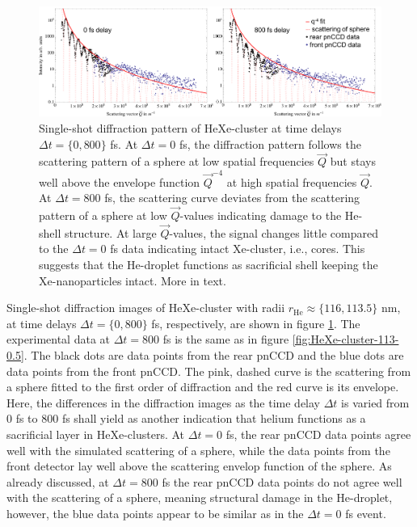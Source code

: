 \begin{figure}
	\centering
		\includegraphics[width=1.00\textwidth]{images/results/HeXe-comparison-0-800-fs.png}
	\caption[Single-shot diffraction patterns of HeXe-cluster at different time delays]{Single-shot diffraction pattern of HeXe-cluster at time delays $\Delta t =\{0,800\}$ fs. At $\Delta t=0$ fs, the diffraction pattern follows the scattering pattern of a sphere at low spatial frequencies $\vec{Q}$ but stays well above the envelope function $\vec{Q}^{-4}$ at high spatial frequencies $\vec{Q}$. At $\Delta t=800$ fs, the scattering curve deviates from the scattering pattern of a sphere at low $\vec{Q}$-values indicating damage to the He-shell structure. At large $\vec{Q}$-values, the signal changes little compared to the $\Delta t=0$ fs data indicating intact Xe-cluster, i.e., cores. This suggests that the He-droplet functions as sacrificial shell keeping the Xe-nanoparticles intact. More in text.}
	\label{fig:HeXe-comparison-0-800-fs}
\end{figure}
Single-shot diffraction images of HeXe-cluster with radii $r_{\text{He}}\approx\{116, 113.5\}$ nm, at time delays $\Delta t =\{0,800\}$ fs, respectively, are shown in figure \ref{fig:HeXe-comparison-0-800-fs}. The experimental data at $\Delta t = 800$ fs is the same as in figure \ref{fig:HeXe-cluster-113-0.5}. The black dots are data points from the rear pnCCD and the blue dots are data points from the front pnCCD. The pink, dashed curve is the scattering from a sphere fitted to the first order of diffraction and the red curve is its envelope. Here, the differences in the diffraction images as the time delay $\Delta t$ is varied from 0 fs to 800 fs shall yield as another indication that helium functions as a sacrificial layer in HeXe-clusters. At $\Delta t=0$ fs, the rear pnCCD data points agree well with the simulated scattering of a sphere, while the data points from the front detector lay well above the scattering envelop function of the sphere. As already discussed, at $\Delta t = 800$ fs the rear pnCCD data points do not agree well with the scattering of a sphere, meaning structural damage in the He-droplet, however, the blue data points appear to be similar as in the $\Delta t=0$ fs event.\\
